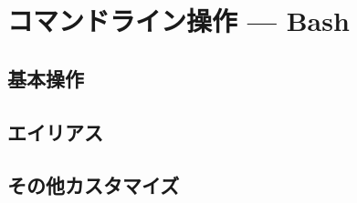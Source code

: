 \documentclass[main]{subfiles}
\begin{document}
\chapter{コマンドライン操作 --- Bash}
\section{基本操作}
\section{エイリアス}
\section{その他カスタマイズ}
\end{document}
